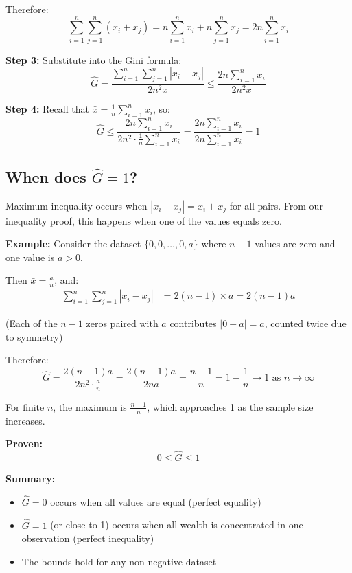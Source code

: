 \documentclass[12pt,a4paper]{article}
\theoremstyle{definition}
\begin{document}
Therefore:
\[
\sum_{i=1}^n \sum_{j=1}^n (x_i + x_j) = n \sum_{i=1}^n x_i + n \sum_{j=1}^n x_j = 2n \sum_{i=1}^n x_i
\]

\textbf{Step 3:} Substitute into the Gini formula:
\[
\hat{G} = \frac{\sum_{i=1}^n \sum_{j=1}^n |x_i - x_j|}{2n^2 \bar{x}} \leq \frac{2n \sum_{i=1}^n x_i}{2n^2 \bar{x}}
\]

\textbf{Step 4:} Recall that $\bar{x} = \frac{1}{n}\sum_{i=1}^n x_i$, so:
\[
\hat{G} \leq \frac{2n \sum_{i=1}^n x_i}{2n^2 \cdot \frac{1}{n}\sum_{i=1}^n x_i} = \frac{2n \sum_{i=1}^n x_i}{2n \sum_{i=1}^n x_i} = 1
\]

\subsection{When does $\hat{G} = 1$?}

Maximum inequality occurs when $|x_i - x_j| = x_i + x_j$ for all pairs. From our inequality proof, this happens when one of the values equals zero.

\textbf{Example:} Consider the dataset $\{0, 0, \ldots, 0, a\}$ where $n-1$ values are zero and one value is $a > 0$.

Then $\bar{x} = \frac{a}{n}$, and:
\begin{align*}
\sum_{i=1}^n \sum_{j=1}^n |x_i - x_j| &= 2(n-1) \times a = 2(n-1)a
\end{align*}

(Each of the $n-1$ zeros paired with $a$ contributes $|0-a| = a$, counted twice due to symmetry)

Therefore:
\[
\hat{G} = \frac{2(n-1)a}{2n^2 \cdot \frac{a}{n}} = \frac{2(n-1)a}{2na} = \frac{n-1}{n} = 1 - \frac{1}{n} \to 1 \text{ as } n \to \infty
\]

For finite $n$, the maximum is $\frac{n-1}{n}$, which approaches 1 as the sample size increases.

\begin{tcolorbox}[colback=green!5!white,colframe=resultcolor,title=Result for Part 3]
\textbf{Proven:}
\[
\boxed{0 \leq \hat{G} \leq 1}
\]

\textbf{Summary:}
\begin{itemize}
    \item $\hat{G} = 0$ occurs when all values are equal (perfect equality)
    \item $\hat{G} = 1$ (or close to 1) occurs when all wealth is concentrated in one observation (perfect inequality)
    \item The bounds hold for any non-negative dataset
\end{itemize}
\end{tcolorbox}
\end{document}
